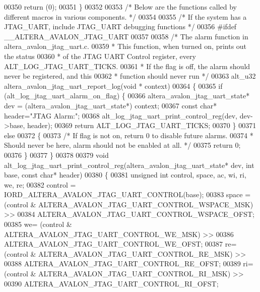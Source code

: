 \begin{DoxyCode}
{{{00350     \textcolor{keywordflow}{return} (0);
00351 \}
00352 
00353 \textcolor{comment}{/* Below are the functions called by different macros in various components. */}
00354 
00355 \textcolor{comment}{/* If the system has a JTAG\_UART, include JTAG\_UART debugging functions */}
00356 \textcolor{preprocessor}{#ifdef \_\_ALTERA\_AVALON\_JTAG\_UART}
00357 
00358 \textcolor{comment}{/* The alarm function in altera\_avalon\_jtag\_uart.c.}
00359 \textcolor{comment}{ * This function, when turned on, prints out the status}
00360 \textcolor{comment}{ * of the JTAG UART Control register, every ALT\_LOG\_JTAG\_UART\_TICKS.}
00361 \textcolor{comment}{ * If the flag is off, the alarm should never be registered, and this}
00362 \textcolor{comment}{ * function should never run */}
00363 alt_u32 altera\_avalon\_jtag\_uart\_report\_log(\textcolor{keywordtype}{void} * context)
00364 \{
00365     \textcolor{keywordflow}{if} (alt\_log\_jtag\_uart\_alarm\_on\_flag) \{
00366     altera\_avalon\_jtag\_uart\_state* dev = (altera\_avalon\_jtag\_uart\_state*) context;
00367         \textcolor{keyword}{const} \textcolor{keywordtype}{char}* header=\textcolor{stringliteral}{"JTAG Alarm:"};
00368         alt\_log\_jtag\_uart\_print\_control\_reg(dev, dev->base, header);
00369         \textcolor{keywordflow}{return} ALT\_LOG\_JTAG\_UART\_TICKS;
00370     \}
00371     \textcolor{keywordflow}{else} 
00372     \{  
00373         \textcolor{comment}{/* If flag is not on, return 0 to disable future alarms.}
00374 \textcolor{comment}{        * Should never be here, alarm should not be enabled at all. */}
00375         \textcolor{keywordflow}{return} 0;
00376     \}
00377 \}
00378 
00379 \textcolor{keywordtype}{void} alt\_log\_jtag\_uart\_print\_control\_reg(altera\_avalon\_jtag\_uart\_state* dev, \textcolor{keywordtype}{int} base, \textcolor{keyword}{const} \textcolor{keywordtype}{char}* header)
00380 \{
00381      \textcolor{keywordtype}{unsigned} \textcolor{keywordtype}{int} control, space, ac, wi, ri, we, re;
00382      control = IORD\_ALTERA\_AVALON\_JTAG\_UART\_CONTROL(base);
00383      space = (control & ALTERA\_AVALON\_JTAG\_UART\_CONTROL\_WSPACE\_MSK) >>
00384              ALTERA\_AVALON\_JTAG\_UART\_CONTROL\_WSPACE\_OFST;
00385      we= (control & ALTERA\_AVALON\_JTAG\_UART\_CONTROL\_WE\_MSK) >>
00386          ALTERA\_AVALON\_JTAG\_UART\_CONTROL\_WE\_OFST;
00387      re= (control & ALTERA\_AVALON\_JTAG\_UART\_CONTROL\_RE\_MSK) >>
00388          ALTERA\_AVALON\_JTAG\_UART\_CONTROL\_RE\_OFST;
00389      ri= (control & ALTERA\_AVALON\_JTAG\_UART\_CONTROL\_RI\_MSK) >>
00390          ALTERA\_AVALON\_JTAG\_UART\_CONTROL\_RI\_OFST;
}}}
\end{DoxyCode}
